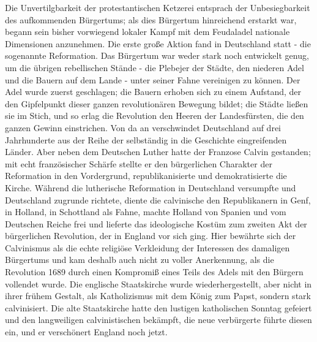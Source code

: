 Die Unvertilgbarkeit der protestantischen Ketzerei entsprach der
Unbesiegbarkeit des aufkommenden Bürgertums; als dies Bürgertum
hinreichend erstarkt war, begann sein bisher vorwiegend lokaler Kampf
mit dem Feudaladel nationale Dimensionen anzunehmen. Die erste große
Aktion fand in Deutschland statt - die sogenannte Reformation. Das
Bürgertum war weder stark noch entwickelt genug, um die übrigen
rebellischen Stände - die Plebejer der Städte, den niederen Adel und die
Bauern auf dem Lande - unter seiner Fahne vereinigen zu können. Der Adel
wurde zuerst geschlagen; die Bauern erhoben sich zu einem Aufstand, der
den Gipfelpunkt dieser ganzen revolutionären Bewegung bildet; die Städte
ließen sie im Stich, und so erlag die Revolution den Heeren der
Landesfürsten, die den ganzen Gewinn einstrichen. Von da an verschwindet
Deutschland auf drei Jahrhunderte aus der Reihe der selbständig in die
Geschichte eingreifenden Länder. Aber neben dem Deutschen Luther hatte
der Franzose Calvin gestanden; mit echt französischer Schärfe stellte er
den bürgerlichen Charakter der Reformation in den Vordergrund,
republikanisierte und
demokratisierte die Kirche.
Während die lutherische Reformation in Deutschland versumpfte und
Deutschland zugrunde richtete, diente die calvinische den Republikanern
in Genf, in Holland, in Schottland als Fahne, machte Holland von Spanien
und vom Deutschen Reiche frei und lieferte das ideologische Kostüm zum
zweiten Akt der bürgerlichen Revolution, der in England vor sich ging.
Hier bewährte sich der Calvinismus als die echte religiöse Verkleidung
der Interessen des damaligen Bürgertums und kam deshalb auch nicht zu
voller Anerkennung, als die Revolution 1689 durch einen Kompromiß eines
Teils des Adels mit den Bürgern vollendet wurde. Die englische
Staatskirche wurde wiederhergestellt, aber nicht in ihrer frühem
Gestalt, als Katholizismus mit dem König zum Papst, sondern stark
calvinisiert. Die alte Staatskirche hatte den lustigen katholischen
Sonntag gefeiert und den langweiligen calvinistischen bekämpft, die neue
verbürgerte führte diesen ein, und er verschönert England noch jetzt.

